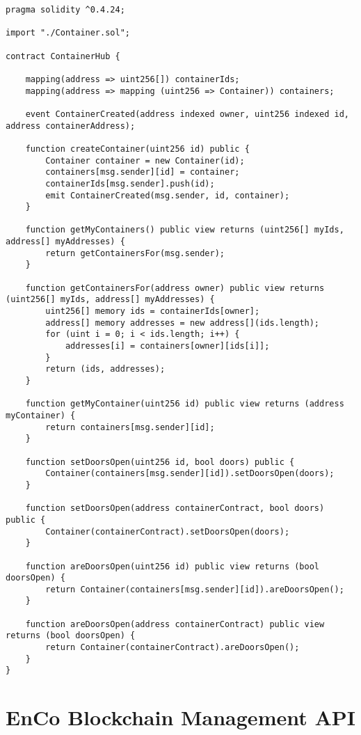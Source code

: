 \documentclass[12pt]{article}
\begin{document}
\begin{lstlisting}[frame=single,basicstyle=\tiny,language=Solidity]
pragma solidity ^0.4.24;

import "./Container.sol";

contract ContainerHub {

    mapping(address => uint256[]) containerIds;
    mapping(address => mapping (uint256 => Container)) containers;

    event ContainerCreated(address indexed owner, uint256 indexed id, address containerAddress);

    function createContainer(uint256 id) public {
        Container container = new Container(id);
        containers[msg.sender][id] = container;
        containerIds[msg.sender].push(id);
        emit ContainerCreated(msg.sender, id, container);
    }

    function getMyContainers() public view returns (uint256[] myIds, address[] myAddresses) {
        return getContainersFor(msg.sender);
    }

    function getContainersFor(address owner) public view returns (uint256[] myIds, address[] myAddresses) {
        uint256[] memory ids = containerIds[owner];
        address[] memory addresses = new address[](ids.length);
        for (uint i = 0; i < ids.length; i++) {
            addresses[i] = containers[owner][ids[i]];
        }
        return (ids, addresses);
    }

    function getMyContainer(uint256 id) public view returns (address myContainer) {
        return containers[msg.sender][id];
    }

    function setDoorsOpen(uint256 id, bool doors) public {
        Container(containers[msg.sender][id]).setDoorsOpen(doors);
    }

    function setDoorsOpen(address containerContract, bool doors) public {
        Container(containerContract).setDoorsOpen(doors);
    }

    function areDoorsOpen(uint256 id) public view returns (bool doorsOpen) {
        return Container(containers[msg.sender][id]).areDoorsOpen();
    }

    function areDoorsOpen(address containerContract) public view returns (bool doorsOpen) {
        return Container(containerContract).areDoorsOpen();
    }
}
\end{lstlisting}

\section{EnCo Blockchain Management API}
\end{document}
